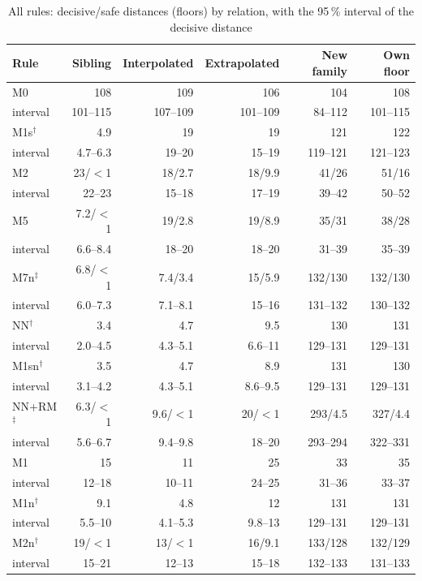 \documentclass[pdflatex,sn-basic]{sn-jnl}
\newcommand{\tabsizesmall}{\footnotesize}
\begin{document}
\begin{table}[p]
\tabsizesmall
\setlength{\tabcolsep}{4pt}
\caption{All rules: decisive/safe distances (floors) by relation, with the 95\,\% interval of the decisive distance}\label{tab:s-all}
\begin{tabular}{@{}lrrrrr@{}}
\toprule
Rule & Sibling & Interpolated & Extrapolated & New family & Own floor \\
\midrule
M0 & 108 & 109 & 106 & 104 & 108 \\
\quad interval & 101--115 & 107--109 & 101--109 & 84--112 & 101--115 \\
M1s$^\dagger$ & 4.9 & 19 & 19 & 121 & 122 \\
\quad interval & 4.7--6.3 & 19--20 & 15--19 & 119--121 & 121--123 \\
M2 & 23/$<$1 & 18/2.7 & 18/9.9 & 41/26 & 51/16 \\
\quad interval & 22--23 & 15--18 & 17--19 & 39--42 & 50--52 \\
M5 & 7.2/$<$1 & 19/2.8 & 19/8.9 & 35/31 & 38/28 \\
\quad interval & 6.6--8.4 & 18--20 & 18--20 & 31--39 & 35--39 \\
M7n$^\ddagger$ & 6.8/$<$1 & 7.4/3.4 & 15/5.9 & 132/130 & 132/130 \\
\quad interval & 6.0--7.3 & 7.1--8.1 & 15--16 & 131--132 & 130--132 \\
NN$^\dagger$ & 3.4 & 4.7 & 9.5 & 130 & 131 \\
\quad interval & 2.0--4.5 & 4.3--5.1 & 6.6--11 & 129--131 & 129--131 \\
M1sn$^\dagger$ & 3.5 & 4.7 & 8.9 & 131 & 130 \\
\quad interval & 3.1--4.2 & 4.3--5.1 & 8.6--9.5 & 129--131 & 129--131 \\
NN+RM$^\ddagger$ & 6.3/$<$1 & 9.6/$<$1 & 20/$<$1 & 293/4.5 & 327/4.4 \\
\quad interval & 5.6--6.7 & 9.4--9.8 & 18--20 & 293--294 & 322--331 \\
M1 & 15 & 11 & 25 & 33 & 35 \\
\quad interval & 12--18 & 10--11 & 24--25 & 31--36 & 33--37 \\
M1n$^\dagger$ & 9.1 & 4.8 & 12 & 131 & 131 \\
\quad interval & 5.5--10 & 4.1--5.3 & 9.8--13 & 129--131 & 129--131 \\
M2n$^\dagger$ & 19/$<$1 & 13/$<$1 & 16/9.1 & 133/128 & 132/129 \\
\quad interval & 15--21 & 12--13 & 15--18 & 132--133 & 131--133 \\

\end{tabular}
\end{table}
\end{document}
